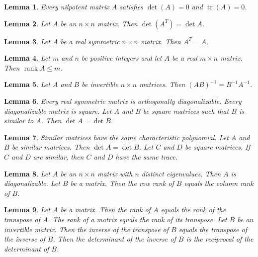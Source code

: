 \documentclass{article}
\newtheorem{lemma}{Lemma}
\begin{document}
\begin{lemma}\label{nilpotent}
Every nilpotent matrix $A$ satisfies $\det(A)=0$ and $\operatorname{tr}(A)=0$.
\end{lemma}

\begin{lemma}\label{implicit-size}
Let $A$ be an $n\times n$ matrix. Then $\det(A^T)=\det A$.
\end{lemma}

\begin{lemma}\label{real-symmetric}
Let $A$ be a real symmetric $n\times n$ matrix. Then $A^T=A$.
\end{lemma}

\begin{lemma}\label{rank-operator}
Let $m$ and $n$ be positive integers and let $A$ be a real $m\times n$ matrix. Then $\operatorname{rank} A\le m$.
\end{lemma}

\begin{lemma}\label{plural-invertible}
Let $A$ and $B$ be invertible $n\times n$ matrices. Then $(AB)^{-1}=B^{-1}A^{-1}$.
\end{lemma}

\begin{lemma}\label{diagonalizable}
Every real symmetric matrix is orthogonally diagonalizable. Every diagonalizable matrix is square. Let $A$ and $B$ be square matrices such that $B$ is similar to $A$. Then $\det A=\det B$.
\end{lemma}

\begin{lemma}\label{similar-invariants}
Similar matrices have the same characteristic polynomial. Let $A$ and $B$ be similar matrices. Then $\det A=\det B$. Let $C$ and $D$ be square matrices. If $C$ and $D$ are similar, then $C$ and $D$ have the same trace.
\end{lemma}

\begin{lemma}\label{eigen-rank}
Let $A$ be an $n\times n$ matrix with $n$ distinct eigenvalues. Then $A$ is diagonalizable. Let $B$ be a matrix. Then the row rank of $B$ equals the column rank of $B$.
\end{lemma}

\begin{lemma}\label{nested-notions}
Let $A$ be a matrix. Then the rank of $A$ equals the rank of the transpose of $A$. The rank of a matrix equals the rank of its transpose. Let $B$ be an invertible matrix. Then the inverse of the transpose of $B$ equals the transpose of the inverse of $B$. Then the determinant of the inverse of $B$ is the reciprocal of the determinant of $B$.
\end{lemma}
\end{document}
